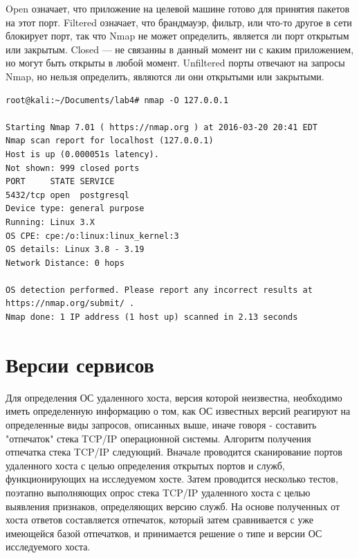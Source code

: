 \documentclass[12pt,a4paper]{report}
\begin{document}
Open означает, что приложение на целевой машине готово для принятия пакетов на этот порт. Filtered означает, что брандмауэр, фильтр, или что-то другое в сети блокирует порт, так что Nmap не может определить, является ли порт открытым или закрытым. Closed — не связанны в данный момент ни с каким приложением, но могут быть открыты в любой момент. Unfiltered порты отвечают на запросы Nmap, но нельзя определить, являются ли они открытыми или закрытыми. 


\begin{lstlisting}[breaklines]
root@kali:~/Documents/lab4# nmap -O 127.0.0.1

Starting Nmap 7.01 ( https://nmap.org ) at 2016-03-20 20:41 EDT
Nmap scan report for localhost (127.0.0.1)
Host is up (0.000051s latency).
Not shown: 999 closed ports
PORT     STATE SERVICE
5432/tcp open  postgresql
Device type: general purpose
Running: Linux 3.X
OS CPE: cpe:/o:linux:linux_kernel:3
OS details: Linux 3.8 - 3.19
Network Distance: 0 hops

OS detection performed. Please report any incorrect results at https://nmap.org/submit/ .
Nmap done: 1 IP address (1 host up) scanned in 2.13 seconds
\end{lstlisting}



\section*{Версии сервисов}

Для определения ОС удаленного хоста, версия которой неизвестна, необходимо иметь определенную информацию о том, как ОС известных версий реагируют на определенные виды запросов, описанных выше, иначе говоря - составить "отпечаток" стека TCP/IP операционной системы.
Алгоритм получения отпечатка стека TCP/IP следующий. Вначале проводится сканирование портов удаленного хоста с целью определения открытых портов и служб, функционирующих на исследуемом хосте. Затем проводится несколько тестов, поэтапно выполняющих опрос стека TCP/IP удаленного хоста с целью выявления   признаков, определяющих версию служб.
На основе полученных от хоста ответов составляется отпечаток, который затем сравнивается с уже имеющейся базой отпечатков, и принимается решение о типе и версии ОС исследуемого хоста.
\end{document}
